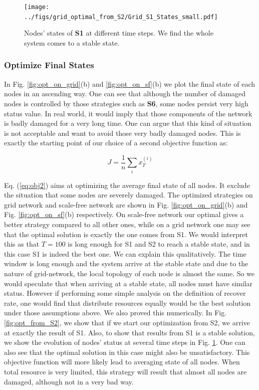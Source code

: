 \begin{figure}
	\centering
	\texttt{[image: ../figs/grid\_optimal\_from\_S2/Grid\_S1\_States\_small.pdf]}
	\caption{Nodes' states of \textbf{S1} at different time steps. We find the whole system comes to a stable state.}
	\label{fig:zhichao}
\end{figure}

\subsubsection{Optimize Final States}
In Fig. \ref{fig:opt_on_grid}(b) and \ref{fig:opt_on_sf}(b) we plot the final state of each nodes in an ascending way. One can see that although the number of damaged nodes is controlled by those strategies such as \textbf{S6}, some nodes persist very high status value. In real world, it would imply that those components of the network is badly damaged for a very long time. One can argue that this kind of situation is not acceptable and want to avoid those very badly damaged nodes. This is exactly the starting point of our choice of a second objective function as:


\begin{equation}
\label{eq:obj2}
	J = \frac{1}{n} \sum_i x_T^{(i)}
\end{equation}

Eq. (\ref{eq:obj2}) aims at optimizing the average final state of all nodes. It exclude the situation that some nodes are severely damaged. The optimized strategies on grid network and scale-free network are shown in Fig. \ref{fig:opt_on_grid}(b) and Fig. \ref{fig:opt_on_sf}(b) respectively. On scale-free network our optimal gives a better strategy compared to all other ones, while on a grid network one may see that the optimal solution is exactly the one comes from S1. We would interpret this as that $T=100$ is long enough for S1 and S2 to reach a stable state, and in this case S1 is indeed the best one. We can explain this qualitatively. The time window is long enough and the system arrive at the stable state and due to the nature of grid-network,  the local topology of each node is almost the same. So we would speculate that when arriving at a stable state, all nodes must have similar status. However if performing some simple analysis on the definition of recover rate, one would find that distribute resources equally would be the best solution under those assumptions above. We also proved this numerically. In Fig. \ref{fig:opt_from_S2}, we show that if we start our optimization from S2, we arrive at exactly the result of S1. Also, to show that results from S1 is a stable solution, we show the evolution of nodes' status at several time steps in Fig. \ref{fig:zhichao}.  One can also see that the optimal solution in this case might also be unsatisfactory. This objective function will more likely lead to averaging state of all nodes. When total resource is very limited, this strategy will result that almost all nodes are damaged, although not in a very bad way. 

